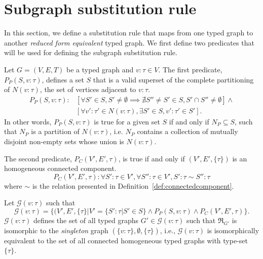 \documentclass[preprint,12pt]{elsarticle}
\theoremstyle{plain}
\newcommand\tyv[2]{#1\!\!:\!\!#2}
\begin{document}

\section{Subgraph substitution rule}\label{sec:substitution}

In this section, we define a substitution rule that maps from
one typed graph to another \textit{reduced form equivalent} typed graph.
We first define two predicates that will be used for defining the 
subgraph substitution rule.

Let $G = (V,E,T)$ be a typed graph and $\tyv{v}{\tau}\in V$.
The first predicate, $P_P(S, \tyv{v}{\tau})$, defines a set $S$ that is a valid superset of the complete partitioning of $N(\tyv{v}{\tau})$,
the set of vertices adjacent to $\tyv{v}{\tau}$.
\begin{equation*}
\begin{split}
P_P(S, \tyv{v}{\tau}): &[\forall S'\in S, S'\neq\emptyset \implies 
  \nexists S''\neq S' \in S, S'\cap S''\neq\emptyset]\wedge \\
  &[\forall \tyv{v'}{\tau'}\in N(\tyv{v}{\tau}), \exists S'\in S, \tyv{v'}{\tau'}\in S'].
\end{split}
\end{equation*}
In other words,
$P_P(S, \tyv{v}{\tau})$ is true for a given set $S$
if and only if
$N_P\subseteq S$, such that $N_P$ is a partition of $N(\tyv{v}{\tau})$,
i.e. $N_P$ contains 
a collection of mutually disjoint non-empty sets whose union is $N(\tyv{v}{\tau})$.

The second predicate, $P_C(V',E',\tau)$, is true if and only if $(V',E',\{\tau\})$ is an 
homogeneous connected component.
\[
P_C(V',E',\tau): \forall \tyv{S'}{\tau}\in V', \forall \tyv{S''}{\tau}\in V',
    \tyv{S'}{\tau}\sim\tyv{S''}{\tau}
\]
where $\sim$ is the relation presented in Definition~\ref{def:connectedcomponent}.

Let $\mathcal{G}(\tyv{v}{\tau})$ such that
\[
\mathcal{G}(\tyv{v}{\tau}) = \{(V',E',\{\tau\}|
    V'=\{\tyv{S'}{\tau}|S'\in S\}\wedge P_P(S, \tyv{v}{\tau}) \wedge P_C(V',E',\tau)\}.
\]
$\mathcal{G}(\tyv{v}{\tau})$ defines the set of all typed graphs $G'\in\mathcal{G}(\tyv{v}{\tau})$
such that $\Re_{G'}$ is isomorphic to the \textit{singleton} graph $(\{\tyv{v}{\tau}\},\emptyset,\{\tau\})$,
i.e., $\mathcal{G}(\tyv{v}{\tau})$ is isomorphically equivalent to the set of all connected homogeneous typed graphs with type-set $\{\tau\}$.
\end{document}
